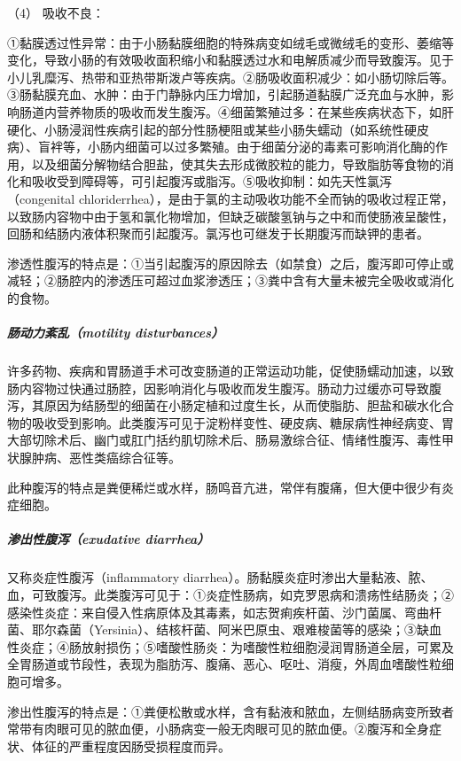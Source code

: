 \hypertarget{text00030.htmlux5cux23CHP1-12-1-2-4}{}
（4） 吸收不良：

①黏膜透过性异常：由于小肠黏膜细胞的特殊病变如绒毛或微绒毛的变形、萎缩等变化，导致小肠的有效吸收面积缩小和黏膜透过水和电解质减少而导致腹泻。见于小儿乳糜泻、热带和亚热带斯泼卢等疾病。②肠吸收面积减少：如小肠切除后等。③肠黏膜充血、水肿：由于门静脉内压力增加，引起肠道黏膜广泛充血与水肿，影响肠道内营养物质的吸收而发生腹泻。④细菌繁殖过多：在某些疾病状态下，如肝硬化、小肠浸润性疾病引起的部分性肠梗阻或某些小肠失蠕动（如系统性硬皮病）、盲袢等，小肠内细菌可以过多繁殖。由于细菌分泌的毒素可影响消化酶的作用，以及细菌分解物结合胆盐，使其失去形成微胶粒的能力，导致脂肪等食物的消化和吸收受到障碍等，可引起腹泻或脂泻。⑤吸收抑制：如先天性氯泻（congenital
chloriderrhea），是由于氯的主动吸收功能不全而钠的吸收过程正常，以致肠内容物中由于氢和氯化物增加，但缺乏碳酸氢钠与之中和而使肠液呈酸性，回肠和结肠内液体积聚而引起腹泻。氯泻也可继发于长期腹泻而缺钾的患者。

渗透性腹泻的特点是：①当引起腹泻的原因除去（如禁食）之后，腹泻即可停止或减轻；②肠腔内的渗透压可超过血浆渗透压；③粪中含有大量未被完全吸收或消化的食物。

\subparagraph{肠动力紊乱（motility disturbances）}

许多药物、疾病和胃肠道手术可改变肠道的正常运动功能，促使肠蠕动加速，以致肠内容物过快通过肠腔，因影响消化与吸收而发生腹泻。肠动力过缓亦可导致腹泻，其原因为结肠型的细菌在小肠定植和过度生长，从而使脂肪、胆盐和碳水化合物的吸收受到影响。此类腹泻可见于淀粉样变性、硬皮病、糖尿病性神经病变、胃大部切除术后、幽门或肛门括约肌切除术后、肠易激综合征、情绪性腹泻、毒性甲状腺肿病、恶性类癌综合征等。

此种腹泻的特点是粪便稀烂或水样，肠鸣音亢进，常伴有腹痛，但大便中很少有炎症细胞。

\subparagraph{渗出性腹泻（exudative diarrhea）}

又称炎症性腹泻（inflammatory
diarrhea）。肠黏膜炎症时渗出大量黏液、脓、血，可致腹泻。此类腹泻可见于：①炎症性肠病，如克罗恩病和溃疡性结肠炎；②感染性炎症：来自侵入性病原体及其毒素，如志贺痢疾杆菌、沙门菌属、弯曲杆菌、耶尔森菌（Yersinia）、结核杆菌、阿米巴原虫、艰难梭菌等的感染；③缺血性炎症；④肠放射损伤；⑤嗜酸性肠炎：为嗜酸性粒细胞浸润胃肠道全层，可累及全胃肠道或节段性，表现为脂肪泻、腹痛、恶心、呕吐、消瘦，外周血嗜酸性粒细胞可增多。

渗出性腹泻的特点是：①粪便松散或水样，含有黏液和脓血，左侧结肠病变所致者常带有肉眼可见的脓血便，小肠病变一般无肉眼可见的脓血便。②腹泻和全身症状、体征的严重程度因肠受损程度而异。

